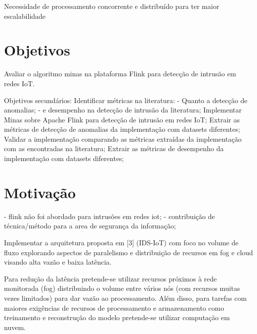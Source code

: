 Necessidade de processamento concorrente e distribuído para ter maior escalabilidade

\section{Objetivos}

Avaliar o algoritmo minas na plataforma Flink para detecção de intrusão em redes IoT.


Objetivos secundários:
Identificar métricas na literatura:
    - Quanto a detecção de anomalias;
    - e desempenho na detecção de intrusão da literatura;
Implementar Minas sobre Apache Flink para detecção de intrusão em redes IoT;
Extrair as métricas de detecção de anomalias da implementação com datasets diferentes;
Validar a implementação comparando as métricas extraídas da implementação com as encontradas na literatura;
Extrair as métricas de desempenho da implementação com datasets diferentes;

\section{Motivação}
- flink não foi abordado para intrusões em redes iot;
- contribuição de técnica/método para a area de segurança da informação;

Implementar a arquitetura proposta em [3] (IDS-IoT) com foco no volume de fluxo
explorando aspectos de paralelismo e distribuição de recursos em fog e cloud visando
alta vazão e baixa latência.

Para redução da latência pretende-se utilizar recursos próximos à rede monitorada (fog) 
distribuindo o volume entre vários nós (com recursos muitas vezes limitados) para dar
vazão ao processamento. Além disso, para tarefas com maiores exigências de recursos de
processamento e armazenamento como treinamento e reconstrução do modelo pretende-se utilizar computação em nuvem.


